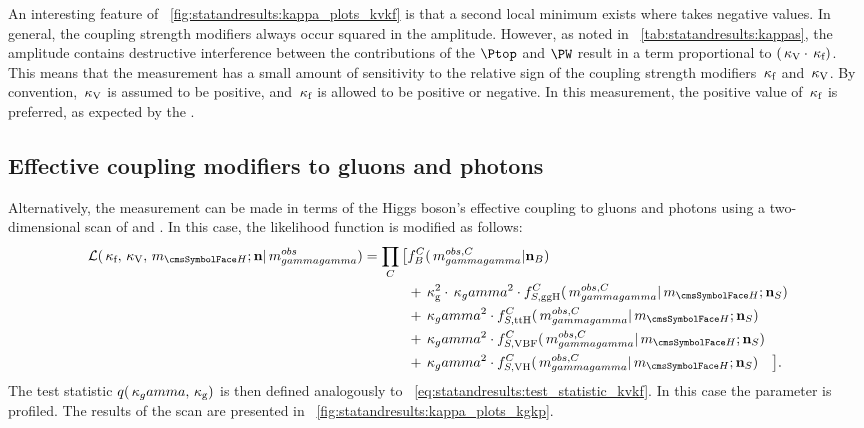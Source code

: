An interesting feature of \Fig~\ref{fig:statandresults:kappa_plots_kvkf} is that a second local minimum exists where \kf takes negative values. In general, the coupling strength modifiers always occur squared in the amplitude. However, as noted in \Table~\ref{tab:statandresults:kappas}, the \Hgg amplitude contains destructive interference between the contributions of the $\Ptop$ and $\PW$ result in a term proportional to $(\,\kappa_\text{V}\cdot\,\kappa_\text{f})$. This means that the measurement has a small amount of sensitivity to the relative sign of the coupling strength modifiers $\,\kappa_\text{f}$ and $\,\kappa_\text{V}$. By convention, $\,\kappa_\text{V}$ is assumed to be positive, and $\,\kappa_\text{f}$ is allowed to be positive or negative. In this measurement, the positive value of $\,\kappa_\text{f}$ is preferred, as expected by the \SM.


%

\subsection{Effective coupling modifiers to gluons and photons}
Alternatively, the measurement can be made in terms of the Higgs boson's effective coupling to gluons and photons using a two-dimensional \DNLL scan of \kGlu and \kPho. In this case, the likelihood function is modified as follows:
\begin{equation}
\label{eq:statandresults:likelihood_function_kgkg}
\begin{split}
 \mathcal{L}(\kf,\kV, \mH; \mathbf{n} | \mgg^{obs} ) = \prod_C \big[{}&f^C_B(\mgg^{obs,C} | \mathbf{n}_B ) \\ 
&+ \kGlu^2\cdot \kPho^2 \cdot f^C_{S,{\text{ggH}}}(\mgg^{obs,C} |\mH; \mathbf{n}_S) \\ 
&+ \kPho^2\cdot f^C_{S,{\text{ttH}}}(\mgg^{obs,C} |\mH; \mathbf{n}_S) \\ 
&+ \kPho^2\cdot f^C_{S,{\text{VBF}}}(\mgg^{obs,C} |\mH; \mathbf{n}_S) \\
&+ \kPho^2\cdot f^C_{S,{\text{VH}}}(\mgg^{obs,C} |\mH; \mathbf{n}_S)\quad\big].
\end{split}
\end{equation}
The test statistic $q(\,\kappa_gamma,\,\kappa_\text{g})$ is then defined analogously to \Eq~\ref{eq:statandresults:test_statistic_kvkf}.
In this case the \mH parameter is profiled. The results of the \DNLL scan are presented in \Fig~\ref{fig:statandresults:kappa_plots_kgkp}.

